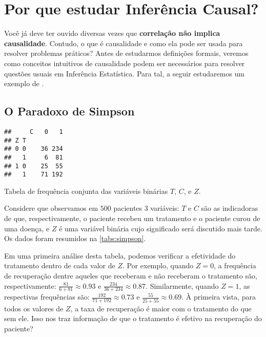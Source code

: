 \chapter{Por que estudar Inferência Causal?}
\label{cap:intro}

Você já deve ter ouvido diversas vezes que
\textbf{correlação não implica causalidade}. Contudo,
o que é causalidade e como 
ela pode ser usada para resolver problemas práticos?
Antes de estudarmos definições formais,
veremos como conceitos intuitivos de causalidade
podem ser necessários para resolver questões
usuais em Inferência Estatística.
Para tal, a seguir estudaremos um exemplo de \citet{Glymour2016}.

\section{O Paradoxo de Simpson}
\label{sec:simpson}

\begin{table}
\begin{knitrout}
\color{fgcolor}\begin{kframe}
\begin{verbatim}
##     C   0   1
## Z T          
## 0 0    36 234
##   1     6  81
## 1 0    25  55
##   1    71 192
\end{verbatim}
\end{kframe}
\end{knitrout}
 \caption{Tabela de frequência conjunta 
 das variáveis binárias $T$, $C$, e $Z$.}
 \label{tabs:simpson}
\end{table}

Considere que observamos em $500$ pacientes $3$ variáveis: 
$T$ e $C$ são as indicadoras de que, respectivamente,
o paciente recebeu um tratamento e o paciente curou de uma doença, e
$Z$ é uma variável binária cujo significado será discutido mais tarde.
Os dados foram resumidos na \cref{tabs:simpson}.

Em uma primeira análise desta tabela, podemos 
verificar a efetividade do tratamento 
dentro de cada valor de $Z$.
Por exemplo, quando $Z=0$,
a frequência de recuperação dentre aqueles que 
receberam e não receberam o tratamento 
são, respectivamente: $\frac{81}{6+81} \approx 0.93$ e
$\frac{234}{36+234} \approx 0.87$.
Similarmente, quando $Z=1$,
as respectivas frequências são:
$\frac{192}{71+192} \approx 0.73$ e
$\frac{55}{25+55} \approx 0.69$.
À primeira vista, para todos os valores de $Z$, a taxa de recuperação 
é maior com o tratamento do que sem ele.
Isso nos traz informação de que 
o tratamento é efetivo na recuperação do paciente?

